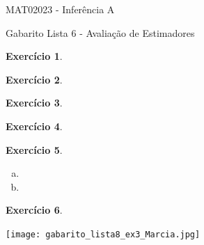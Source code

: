 \documentclass[letter,11pt]{article}
\newtheorem{exer}{Exercício}
\begin{document}
\begin{center}{ \Large MAT02023 - Inferência A }\end{center}

\begin{center}
{\large  \sc Gabarito Lista 6 - Avaliação de Estimadores}
\end{center}
\vspace{15mm}



\begin{exer} \rm
\end{exer}



\begin{exer} \rm
\end{exer}


\begin{exer} \rm
\end{exer}


\begin{exer} \rm
\end{exer}


\begin{exer} \rm

\begin{enumerate}[a)]
  \item %

  \item %
\end{enumerate}

\end{exer}


\begin{exer}
\end{exer}
\texttt{[image: gabarito\_lista8\_ex3\_Marcia.jpg]}
\end{document}
